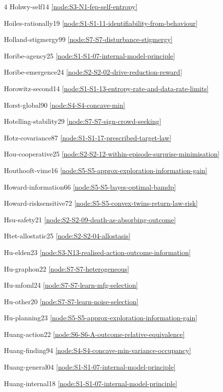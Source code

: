 \documentclass[10pt]{article}
\begin{document}
{\begin{multicols}{4}
Hohwy-self14 \hfill \ref{node:S3-N1-fep-self-entropy}\par
Hoiles-rationally19 \hfill \ref{node:S1-S1-11-identifiability-from-behaviour}\par
Holland-stigmergy99 \hfill \ref{node:S7-S7-disturbance-stigmergy}\par
Horibe-agency25 \hfill \ref{node:S1-S1-07-internal-model-principle}\par
Horibe-emergence24 \hfill \ref{node:S2-S2-02-drive-reduction-reward}\par
Horowitz-second14 \hfill \ref{node:S1-S1-13-entropy-rate-and-data-rate-limits}\par
Horst-global90 \hfill \ref{node:S4-S4-concave-min}\par
Hotelling-stability29 \hfill \ref{node:S7-S7-sign-crowd-seeking}\par
Hotz-covariance87 \hfill \ref{node:S1-S1-17-prescribed-target-law}\par
Hou-cooperative25 \hfill \ref{node:S2-S2-12-within-episode-surprise-minimisation}\par
Houthooft-vime16 \hfill \ref{node:S5-S5-approx-exploration-information-gain}\par
Howard-information66 \hfill \ref{node:S5-S5-bayes-optimal-bamdp}\par
Howard-risksensitive72 \hfill \ref{node:S5-S5-convex-twins-return-law-risk}\par
Hsu-safety21 \hfill \ref{node:S2-S2-09-death-as-absorbing-outcome}\par
Htet-allostatic25 \hfill \ref{node:S2-S2-04-allostasis}\par
Hu-elden23 \hfill \ref{node:S3-N13-realised-action-outcome-information}\par
Hu-graphon22 \hfill \ref{node:S7-S7-heterogeneous}\par
Hu-mfoml24 \hfill \ref{node:S7-S7-learn-mfg-selection}\par
Hu-other20 \hfill \ref{node:S7-S7-learn-noise-selection}\par
Hu-planning23 \hfill \ref{node:S5-S5-approx-exploration-information-gain}\par
Huang-action22 \hfill \ref{node:S6-S6-A-outcome-relative-equivalence}\par
Huang-finding94 \hfill \ref{node:S4-S4-concave-min-variance-occupancy}\par
Huang-general04 \hfill \ref{node:S1-S1-07-internal-model-principle}\par
Huang-internal18 \hfill \ref{node:S1-S1-07-internal-model-principle}\par

\end{multicols}}
\end{document}
